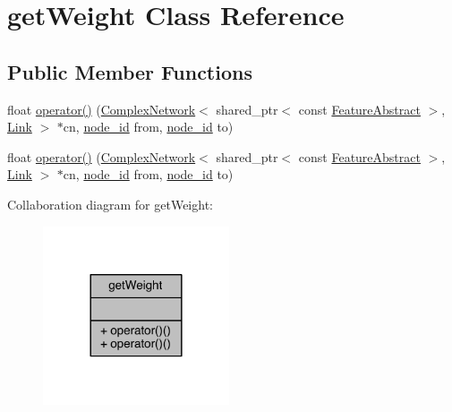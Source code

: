 \hypertarget{classget_weight}{\section{get\+Weight Class Reference}
\label{classget_weight}
}
\subsection*{Public Member Functions}
\begin{DoxyCompactItemize}
\item 
float \hyperlink{classget_weight_aa83177020da3ba8f80a4c1021e695895}{operator()} (\hyperlink{class_complex_network}{Complex\+Network}$<$ shared\+\_\+ptr$<$ const \hyperlink{class_feature_abstract}{Feature\+Abstract} $>$, \hyperlink{class_link}{Link} $>$ $\ast$cn, \hyperlink{_complex_network_8hpp_a8323334ca788fde39682469321590d52}{node\+\_\+id} from, \hyperlink{_complex_network_8hpp_a8323334ca788fde39682469321590d52}{node\+\_\+id} to)
\item 
float \hyperlink{classget_weight_aa83177020da3ba8f80a4c1021e695895}{operator()} (\hyperlink{class_complex_network}{Complex\+Network}$<$ shared\+\_\+ptr$<$ const \hyperlink{class_feature_abstract}{Feature\+Abstract} $>$, \hyperlink{class_link}{Link} $>$ $\ast$cn, \hyperlink{_complex_network_8hpp_a8323334ca788fde39682469321590d52}{node\+\_\+id} from, \hyperlink{_complex_network_8hpp_a8323334ca788fde39682469321590d52}{node\+\_\+id} to)
\end{DoxyCompactItemize}


Collaboration diagram for get\+Weight\+:\nopagebreak
\begin{figure}[H]
\begin{center}
\leavevmode
\includegraphics[width=156pt]{classget_weight__coll__graph}
\end{center}
\end{figure}



